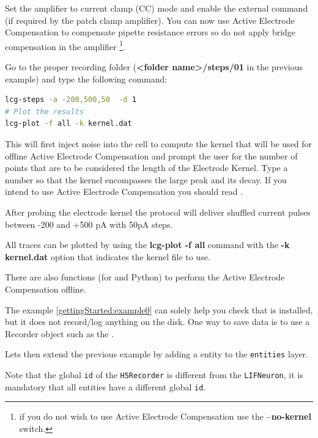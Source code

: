 Set the amplifier to current clamp (CC) mode and enable the external command (if required by the patch clamp amplifier). You can now use Active Electrode Compensation to compensate pipette resistance errors so do not apply bridge compensation in the amplifier \footnote{if you do not wish to use Active Electrode Compensation use the \textbf{--no-kernel} switch.}. 

Go to the proper recording folder (\textbf{<folder name>/steps/01} in the previous example) and type the following command:
 \begin{lstlisting}[numbers=none,language=bash]
lcg-steps -a -200,500,50  -d 1 
# Plot the results
lcg-plot -f all -k kernel.dat
\end{lstlisting}

This will first inject noise into the cell to compute the kernel that will be used for offline Active Electrode Compensation and prompt the user for the number of points that are to be considered the length of the Electrode Kernel. 
Type a number so that the kernel encompasses the large peak and its decay. If you intend to use Active Electrode Compensation you should read \cite{Brette:2008}.

After probing the electrode kernel the protocol will deliver shuffled current pulses between -200 and +500 pA with 50pA steps.

All traces can be plotted by using the \textbf{lcg-plot -f all} command with the \textbf{-k kernel.dat} option that indicates the kernel file to use.

There are also functions (for \matlab and Python) to perform the Active Electrode Compensation offline.

\iffalse

The example \ref{gettingStarted:example0} can solely help you check that \texttt{\progname} is installed, but it does not record/log anything on the disk. One way to save data is to use a Recorder object such as the .





Lets then extend the previous example by adding a  entity to the \texttt{entities} layer. 

Note that the global \texttt{id} of the \texttt{H5Recorder} is different from the \texttt{LIFNeuron}, it is mandatory that all entities have a different global \texttt{id}.

